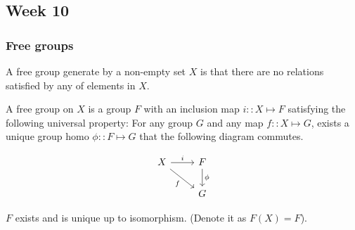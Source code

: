 \subsection{Week 10}
\subsubsection{Free groups}
A free group generate by a non-empty set $X$ is that 
there are no relations satisfied by any of elements in $X$.

\begin{definition}
  A free group on $X$ is a group $F$ with an inclusion map $i:: X \mapsto F$ satisfying the 
  following universal property: For any group $G$ and any map $f:: X \mapsto G$, 
  exists a unique group homo $\phi :: F \mapsto G$ that the following diagram commutes.

  \[
    \begin{tikzcd}
    X \arrow{r}{i} \arrow[swap]{dr}{f} & F \arrow{d}{\phi} \\
    & G
    \end{tikzcd}
  \]
\end{definition}

\begin{theorem}
  $F$ exists and is unique up to isomorphism. (Denote it as $F(X) = F$).
\end{theorem}

